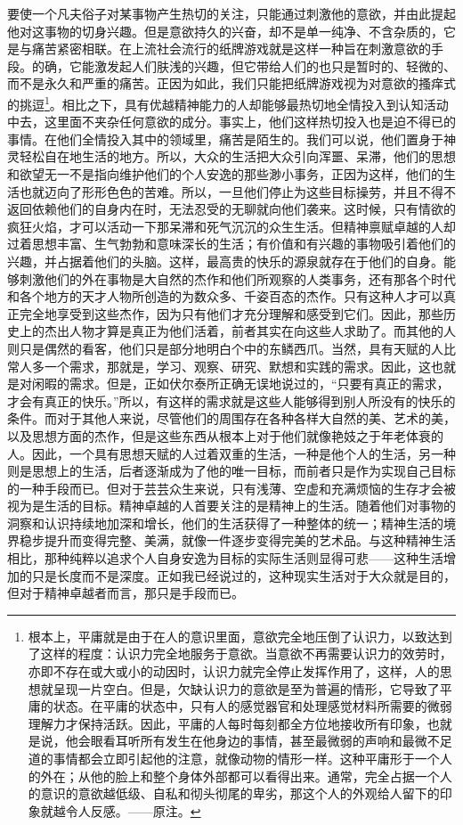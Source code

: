 \documentclass[12pt,oneside]{book}
\begin{document}
要使一个凡夫俗子对某事物产生热切的关注，只能通过刺激他的意欲，并由此提起他对这事物的切身兴趣。但是意欲持久的兴奋，却不是单一纯净、不含杂质的，它是与痛苦紧密相联。在上流社会流行的纸牌游戏就是这样一种旨在刺激意欲的手段。的确，它能激发起人们肤浅的兴趣，但它带给人们的也只是暂时的、轻微的、而不是永久和严重的痛苦。正因为如此，我们只能把纸牌游戏视为对意欲的搔痒式的挑逗\footnote{根本上，平庸就是由于在人的意识里面，意欲完全地压倒了认识力，以致达到了这样的程度：认识力完全地服务于意欲。当意欲不再需要认识力的效劳时，亦即不存在或大或小的动因时，认识力就完全停止发挥作用了，这样，人的思想就呈现一片空白。但是，欠缺认识力的意欲是至为普遍的情形，它导致了平庸的状态。在平庸的状态中，只有人的感觉器官和处理感觉材料所需要的微弱理解力才保持活跃。因此，平庸的人每时每刻都全方位地接收所有印象，也就是说，他会眼看耳听所有发生在他身边的事情，甚至最微弱的声响和最微不足道的事情都会立即引起他的注意，就像动物的情形一样。这种平庸形于一个人的外在；从他的脸上和整个身体外部都可以看得出来。通常，完全占据一个人的意识的意欲越低级、自私和彻头彻尾的卑劣，那这个人的外观给人留下的印象就越令人反感。——原注。}。相比之下，具有优越精神能力的人却能够最热切地全情投入到认知活动中去，这里面不夹杂任何意欲的成分。事实上，他们这样热切投入也是迫不得已的事情。在他们全情投入其中的领域里，痛苦是陌生的。我们可以说，他们置身于神灵轻松自在地生活的地方。所以，大众的生活把大众引向浑噩、呆滞，他们的思想和欲望无一不是指向维护他们的个人安逸的那些渺小事务，正因为这样，他们的生活也就迈向了形形色色的苦难。所以，一旦他们停止为这些目标操劳，并且不得不返回依赖他们的自身内在时，无法忍受的无聊就向他们袭来。这时候，只有情欲的疯狂火焰，才可以活动一下那呆滞和死气沉沉的众生生活。但精神禀赋卓越的人却过着思想丰富、生气勃勃和意味深长的生活；有价值和有兴趣的事物吸引着他们的兴趣，并占据着他们的头脑。这样，最高贵的快乐的源泉就存在于他们的自身。能够刺激他们的外在事物是大自然的杰作和他们所观察的人类事务，还有那各个时代和各个地方的天才人物所创造的为数众多、千姿百态的杰作。只有这种人才可以真正完全地享受到这些杰作，因为只有他们才充分理解和感受到它们。因此，那些历史上的杰出人物才算是真正为他们活着，前者其实在向这些人求助了。而其他的人则只是偶然的看客，他们只是部分地明白个中的东鳞西爪。当然，具有天赋的人比常人多一个需求，那就是，学习、观察、研究、默想和实践的需求。因此，这也就是对闲暇的需求。但是，正如伏尔泰所正确无误地说过的，“只要有真正的需求，才会有真正的快乐。”所以，有这样的需求就是这些人能够得到别人所没有的快乐的条件。而对于其他人来说，尽管他们的周围存在各种各样大自然的美、艺术的美，以及思想方面的杰作，但是这些东西从根本上对于他们就像艳妓之于年老体衰的人。因此，一个具有思想天赋的人过着双重的生活，一种是他个人的生活，另一种则是思想上的生活，后者逐渐成为了他的唯一目标，而前者只是作为实现自己目标的一种手段而已。但对于芸芸众生来说，只有浅薄、空虚和充满烦恼的生存才会被视为是生活的目标。精神卓越的人首要关注的是精神上的生活。随着他们对事物的洞察和认识持续地加深和增长，他们的生活获得了一种整体的统一；精神生活的境界稳步提升而变得完整、美满，就像一件逐步变得完美的艺术品。与这种精神生活相比，那种纯粹以追求个人自身安逸为目标的实际生活则显得可悲——这种生活增加的只是长度而不是深度。正如我已经说过的，这种现实生活对于大众就是目的，但对于精神卓越者而言，那只是手段而已。 
\end{document}
